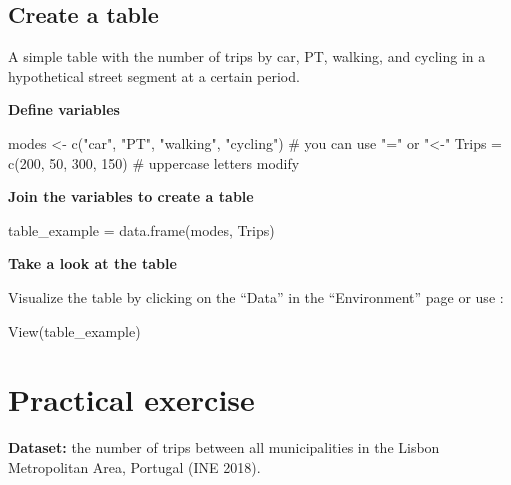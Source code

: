 \documentclass[
  letterpaper,
  DIV=11,
  numbers=noendperiod]{scrreprt}
\newenvironment{Shaded}{\begin{snugshade}}{\end{snugshade}}
\newcommand{\CommentTok}[1]{\textcolor[rgb]{0.37,0.37,0.37}{#1}}
\newcommand{\DecValTok}[1]{\textcolor[rgb]{0.68,0.00,0.00}{#1}}
\newcommand{\FunctionTok}[1]{\textcolor[rgb]{0.28,0.35,0.67}{#1}}
\newcommand{\NormalTok}[1]{\textcolor[rgb]{0.00,0.23,0.31}{#1}}
\newcommand{\OtherTok}[1]{\textcolor[rgb]{0.00,0.23,0.31}{#1}}
\newcommand{\StringTok}[1]{\textcolor[rgb]{0.13,0.47,0.30}{#1}}
\begin{document}
\subsection{Create a table}\label{create-a-table}

A simple table with the number of trips by car, PT, walking, and cycling
in a hypothetical street segment at a certain period.

\textbf{Define variables}

\begin{Shaded}
\begin{Highlighting}[]
\NormalTok{modes }\OtherTok{\textless{}{-}} \FunctionTok{c}\NormalTok{(}\StringTok{"car"}\NormalTok{, }\StringTok{"PT"}\NormalTok{, }\StringTok{"walking"}\NormalTok{, }\StringTok{"cycling"}\NormalTok{) }\CommentTok{\# you can use "=" or "\textless{}{-}"}
\NormalTok{Trips }\OtherTok{=} \FunctionTok{c}\NormalTok{(}\DecValTok{200}\NormalTok{, }\DecValTok{50}\NormalTok{, }\DecValTok{300}\NormalTok{, }\DecValTok{150}\NormalTok{) }\CommentTok{\# uppercase letters modify}
\end{Highlighting}
\end{Shaded}

\textbf{Join the variables to create a table}

\begin{Shaded}
\begin{Highlighting}[]
\NormalTok{table\_example }\OtherTok{=} \FunctionTok{data.frame}\NormalTok{(modes, Trips)}
\end{Highlighting}
\end{Shaded}

\textbf{Take a look at the table}

Visualize the table by clicking on the ``Data'' in the ``Environment''
page or use :

\begin{Shaded}
\begin{Highlighting}[]
\FunctionTok{View}\NormalTok{(table\_example)}
\end{Highlighting}
\end{Shaded}

\section{Practical exercise}\label{practical-exercise}

\textbf{Dataset:} the number of trips between all municipalities in the
Lisbon Metropolitan Area, Portugal (INE 2018).
\end{document}
